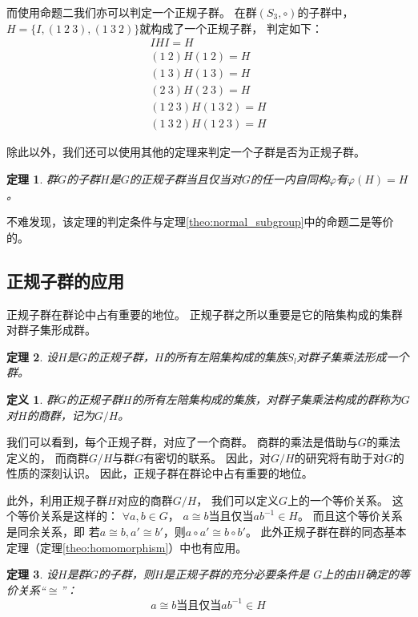 \documentclass[12pt,onecolumn]{article}
\theoremstyle{plain}
\newtheorem{definition}{定义}[section]
\newtheorem{theorem}{定理}[section]
\begin{document}
而使用命题二我们亦可以判定一个正规子群。
在群$(S_3, \circ)$的子群中，
$H = \{I, (1~2~3), (1~3~2)\}$就构成了一个正规子群，
判定如下：
\begin{gather*}
 IHI              = H \\
 (1~2)H(1~2)      = H \\
 (1~3)H(1~3)      = H \\
 (2~3)H(2~3)      = H \\
 (1~2~3)H(1~3~2)  = H \\
 (1~3~2)H(1~2~3)  = H
\end{gather*}


除此以外，我们还可以使用其他的定理来判定一个子群是否为正规子群。

\begin{theorem}
 群$G$的子群$H$是$G$的正规子群当且仅当对$G$的任一内自同构$\varphi$有$\varphi(H) = H$。
\end{theorem}

不难发现，该定理的判定条件与定理\ref{theo:normal_subgroup}中的命题二是等价的。

\subsection{正规子群的应用}
正规子群在群论中占有重要的地位。
正规子群之所以重要是它的陪集构成的集群对群子集形成群。

\begin{theorem}
 设$H$是$G$的正规子群，$H$的所有左陪集构成的集族$S_l$对群子集乘法形成一个群。
\end{theorem}

\begin{definition}
 群$G$的正规子群$H$的所有左陪集构成的集族，对群子集乘法构成的群称为$G$对$H$的商群，记为$G / H$。
\end{definition}

我们可以看到，每个正规子群，对应了一个商群。
商群的乘法是借助与$G$的乘法定义的，
而商群$G / H$与群$G$有密切的联系。
因此，对$G / H$的研究将有助于对$G$的性质的深刻认识。
因此，正规子群在群论中占有重要的地位。

此外，利用正规子群$H$对应的商群$G / H$，
我们可以定义$G$上的一个等价关系。
这个等价关系是这样的：
$\forall a, b \in G$，
$a \cong b$当且仅当$ab^{-1} \in H$。
而且这个等价关系是同余关系，即
若$a \cong b, a' \cong b'$，则$a \circ a' \cong b \circ b'$。
此外正规子群在群的同态基本定理（定理\ref{theo:homomorphism}）中也有应用。

\begin{theorem}
 设$H$是群$G$的子群，则$H$是正规子群的充分必要条件是
 $G$上的由$H$确定的等价关系“$\cong$”：
 \[
 a \cong b \text{当且仅当} ab^{-1} \in H
 \]
\end{theorem}
\end{document}
